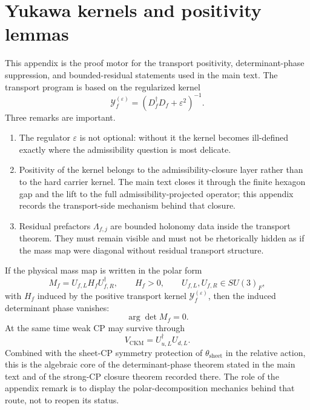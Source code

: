 \section{Yukawa kernels and positivity lemmas}
\label{app:yukawa}

This appendix is the proof motor for the transport positivity, determinant-phase suppression, and
bounded-residual statements used in the main text. The transport program is based on the regularized kernel
\[
\mathcal Y_f^{(\varepsilon)}=(D_f^\dagger D_f+\varepsilon^2)^{-1}.
\]
Three remarks are important.
\begin{enumerate}[leftmargin=1.5em, topsep=3pt, itemsep=3pt]
    \item The regulator $\varepsilon$ is not optional: without it the kernel becomes ill-defined exactly where the admissibility question is most delicate.
    \item Positivity of the kernel belongs to the admissibility-closure layer rather than to the hard carrier kernel. The main text closes it through the finite hexagon gap and the lift to the full admissibility-projected operator; this appendix records the transport-side mechanism behind that closure.
    \item Residual prefactors $\Lambda_{f,j}$ are bounded holonomy data inside the transport theorem. They must remain visible and must not be rhetorically hidden as if the mass map were diagonal without residual transport structure.
\end{enumerate}

\begin{remark}
If the physical mass map is written in the polar form
\[
M_f=U_{f,L}H_fU_{f,R}^\dagger,
\qquad
H_f>0,
\qquad
U_{f,L},U_{f,R}\in SU(3)_F,
\]
with $H_f$ induced by the positive transport kernel $\mathcal Y_f^{(\varepsilon)}$, then the induced determinant phase vanishes:
\[
\arg\det M_f=0.
\]
At the same time weak CP may survive through
\[
V_{\mathrm{CKM}}=U_{u,L}^\dagger U_{d,L}.
\]
Combined with the sheet-CP symmetry protection of $\theta_{\mathrm{sheet}}$ in the relative action,
this is the algebraic core of the determinant-phase theorem stated in the main text and of the
strong-CP closure theorem recorded there. The role of the appendix remark is to display the
polar-decomposition mechanics behind that route, not to reopen its status.
\end{remark}

